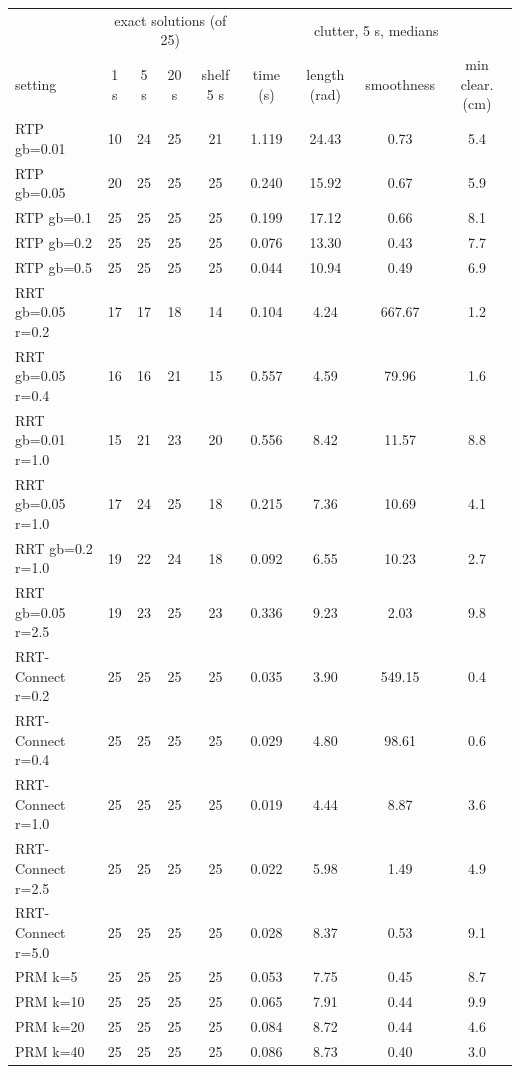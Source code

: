 \documentclass{comp450}
\begin{document}
\begin{table}[p]
\centering
\footnotesize
\setlength{\tabcolsep}{3pt}
\begin{tabular}{lcccc|cccc}
\toprule
 & \multicolumn{4}{c|}{exact solutions (of 25)} & \multicolumn{4}{c}{clutter, 5 s, medians} \\
setting & 1 s & 5 s & 20 s & shelf 5 s & time (s) & length (rad) & smoothness & min clear. (cm) \\
\midrule
RTP gb=0.01 & 10 & 24 & 25 & 21 & 1.119 & 24.43 & 0.73 & 5.4 \\
RTP gb=0.05 & 20 & 25 & 25 & 25 & 0.240 & 15.92 & 0.67 & 5.9 \\
RTP gb=0.1 & 25 & 25 & 25 & 25 & 0.199 & 17.12 & 0.66 & 8.1 \\
RTP gb=0.2 & 25 & 25 & 25 & 25 & 0.076 & 13.30 & 0.43 & 7.7 \\
RTP gb=0.5 & 25 & 25 & 25 & 25 & 0.044 & 10.94 & 0.49 & 6.9 \\
\midrule
RRT gb=0.05 r=0.2 & 17 & 17 & 18 & 14 & 0.104 & 4.24 & 667.67 & 1.2 \\
RRT gb=0.05 r=0.4 & 16 & 16 & 21 & 15 & 0.557 & 4.59 & 79.96 & 1.6 \\
RRT gb=0.01 r=1.0 & 15 & 21 & 23 & 20 & 0.556 & 8.42 & 11.57 & 8.8 \\
RRT gb=0.05 r=1.0 & 17 & 24 & 25 & 18 & 0.215 & 7.36 & 10.69 & 4.1 \\
RRT gb=0.2 r=1.0 & 19 & 22 & 24 & 18 & 0.092 & 6.55 & 10.23 & 2.7 \\
RRT gb=0.05 r=2.5 & 19 & 23 & 25 & 23 & 0.336 & 9.23 & 2.03 & 9.8 \\
\midrule
RRT-Connect r=0.2 & 25 & 25 & 25 & 25 & 0.035 & 3.90 & 549.15 & 0.4 \\
RRT-Connect r=0.4 & 25 & 25 & 25 & 25 & 0.029 & 4.80 & 98.61 & 0.6 \\
RRT-Connect r=1.0 & 25 & 25 & 25 & 25 & 0.019 & 4.44 & 8.87 & 3.6 \\
RRT-Connect r=2.5 & 25 & 25 & 25 & 25 & 0.022 & 5.98 & 1.49 & 4.9 \\
RRT-Connect r=5.0 & 25 & 25 & 25 & 25 & 0.028 & 8.37 & 0.53 & 9.1 \\
\midrule
PRM k=5 & 25 & 25 & 25 & 25 & 0.053 & 7.75 & 0.45 & 8.7 \\
PRM k=10 & 25 & 25 & 25 & 25 & 0.065 & 7.91 & 0.44 & 9.9 \\
PRM k=20 & 25 & 25 & 25 & 25 & 0.084 & 8.72 & 0.44 & 4.6 \\
PRM k=40 & 25 & 25 & 25 & 25 & 0.086 & 8.73 & 0.40 & 3.0 \\

\end{tabular}
\end{table}
\end{document}
